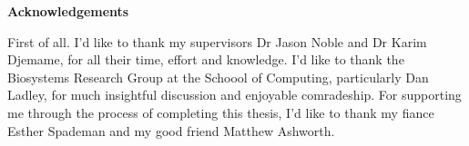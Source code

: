 \pagestyle{plain}

\begin{center}
    {\LARGE\bf Acknowledgements}
\end{center}

First of all. I'd like to thank my supervisors Dr Jason Noble and Dr Karim
Djemame, for all their time, effort and knowledge. I'd like to thank the
Biosystems Research Group at the Schoool of Computing, particularly Dan Ladley,
for much insightful discussion and enjoyable comradeship. For supporting me
through the process of completing this thesis, I'd like to thank my fiance
Esther Spademan and my good friend Matthew Ashworth.


\newpage

